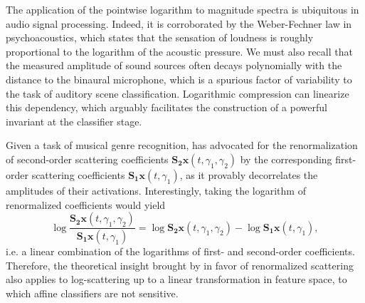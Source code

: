 \documentclass[journal]{IEEEtran}
\makeatletter
\newcommand*{\ie}{i.e.\@\xspace}
\makeatother
\begin{document}


The application of the pointwise logarithm to magnitude spectra is ubiquitous in audio signal processing.
Indeed, it is corroborated by the Weber-Fechner law in psychoacoustics, which states that the sensation of loudness is roughly proportional to the logarithm of the acoustic pressure.
We must also recall that the measured amplitude of sound sources often decays polynomially with the distance to the binaural microphone, which is a spurious factor of variability to the task of auditory scene classification.
Logarithmic compression can linearize this dependency, which arguably facilitates the construction of a powerful invariant at the classifier stage.

Given a task of musical genre recognition, \cite{Anden2014} has advocated for the renormalization of second-order scattering coefficients $\mathbf{S_2}\boldsymbol{x}(t,\gamma_1,\gamma_2)$ by the corresponding first-order scattering coefficients $\mathbf{S_1}\boldsymbol{x}(t,\gamma_1)$, as it provably decorrelates the amplitudes of their activations.
Interestingly, taking the logarithm of renormalized coefficients would yield
\begin{equation}
\log \dfrac{\mathbf{S_2}\boldsymbol{x}(t,\gamma_1,\gamma_2)}{\mathbf{S_1}\boldsymbol{x}(t,\gamma_1)} =
\log \mathbf{S_2}\boldsymbol{x}(t, \gamma_1, \gamma_2) -
\log \mathbf{S_1}\boldsymbol{x}(t, \gamma_1),
\end{equation}
\ie a linear combination of the logarithms of first- and second-order coefficients.
Therefore, the theoretical insight brought by \cite{Anden2014} in favor of renormalized scattering also applies to log-scattering up to a linear transformation in feature space, to which affine classifiers are not sensitive.
\end{document}
